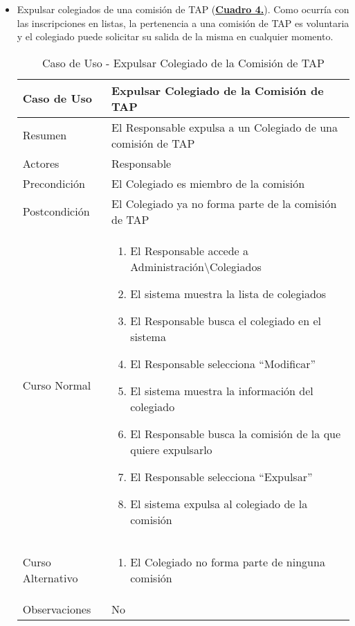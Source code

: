 \begin{itemize}
  \pagebreak
	\item \addtocounter{tabla}{1} Expulsar colegiados de una comisión de TAP (\textbf{\hyperref[tab:curExpulsarColegComisionTAP]{Cuadro 4.}}). Como ocurría con las inscripciones en listas, la pertenencia a una comisión de TAP es voluntaria y el colegiado puede solicitar su salida de la misma en cualquier momento.
		\begin{table}[!htbp]
		  \centering  \addtocounter{casouso}{1}
		  \begin{tabular}{|l | p{100mm}|}
		    \textbf{Caso de Uso}  & \textbf{Expulsar Colegiado de la Comisión de TAP} \\ \hline
		    Resumen 		 & El Responsable expulsa a un Colegiado de una comisión de TAP \\ \hline
		    Actores  		 & Responsable \\ \hline
		    Precondición  	 & El Colegiado es miembro de la comisión  \\ \hline
		    Postcondición  	 & El Colegiado ya no forma parte de la comisión de TAP \\ \hline
		    Curso Normal   	 & \begin{enumerate}
		    \item El Responsable accede a Administración\textbackslash Colegiados
			  \item El sistema muestra la lista de colegiados
			  \item El Responsable busca el colegiado en el sistema
			  \item El Responsable selecciona ``Modificar''
			  \item El sistema muestra la información del colegiado
			  \item El Responsable busca la comisión de la que quiere expulsarlo
			  \item El Responsable selecciona ``Expulsar''
			  \item El sistema expulsa al colegiado de la comisión
		    \end{enumerate}  \\ \hline
		    Curso Alternativo  & \begin{enumerate}
			  \item El Colegiado no forma parte de ninguna comisión
		    \end{enumerate}  \\ \hline
		    Observaciones 	 & No  \\ \hline
		  \end{tabular}
		  \caption{Caso de Uso  - Expulsar Colegiado de la Comisión de TAP}
		  \label{tab:curExpulsarColegComisionTAP}
		\end{table}
		\FloatBarrier 
  

\end{itemize}
